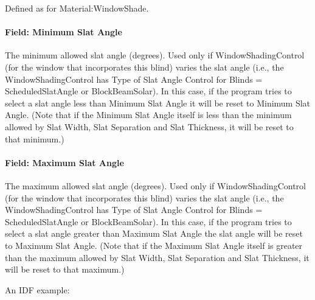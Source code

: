 Defined as for Material:WindowShade.

\paragraph{Field: Minimum Slat Angle}\label{field-minimum-slat-angle}

The minimum allowed slat angle (degrees). Used only if WindowShadingControl (for the window that incorporates this blind) varies the slat angle (i.e., the WindowShadingControl has Type of Slat Angle Control for Blinds = ScheduledSlatAngle or BlockBeamSolar). In this case, if the program tries to select a slat angle less than Minimum Slat Angle it will be reset to Minimum Slat Angle. (Note that if the Minimum Slat Angle itself is less than the minimum allowed by Slat Width, Slat Separation and Slat Thickness, it will be reset to that minimum.)

\paragraph{Field: Maximum Slat Angle}\label{field-maximum-slat-angle}

The maximum allowed slat angle (degrees). Used only if WindowShadingControl (for the window that incorporates this blind) varies the slat angle (i.e., the WindowShadingControl has Type of Slat Angle Control for Blinds = ScheduledSlatAngle or BlockBeamSolar). In this case, if the program tries to select a slat angle greater than Maximum Slat Angle the slat angle will be reset to Maximum Slat Angle. (Note that if the Maximum Slat Angle itself is greater than the maximum allowed by Slat Width, Slat Separation and Slat Thickness, it will be reset to that maximum.)

An IDF example:


